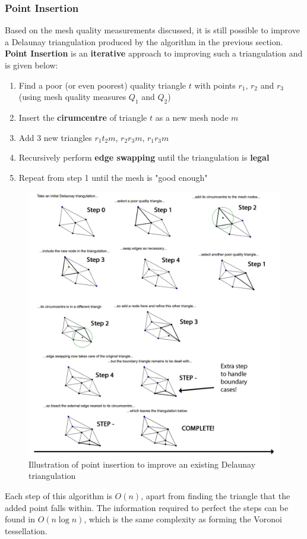 \documentclass{article}
\begin{document}
\subsubsection{Point Insertion}

Based on the mesh quality measurements discussed, it is still possible to improve a Delaunay triangulation produced by the algorithm in the previous section. \textbf{Point Insertion} is an \textbf{iterative} approach to improving such a triangulation and is given below:
\begin{enumerate}
	\item Find a poor (or even poorest) quality triangle $t$ with points $r_1$, $r_2$ and $r_3$ (using mesh quality measures $Q_1$ and $Q_2$)
	\item Insert the \textbf{cirumcentre} of triangle $t$ as a new mesh node $m$
	\item Add 3 new triangles $r_1t_2m$, $r_2r_3m$, $r_1r_3m$
	\item Recursively perform \textbf{edge swapping} until the triangulation is \textbf{legal}
	\item Repeat from step 1 until the mesh is "good enough"
\end{enumerate}

\begin{figure}[H]
	\centering
	\includegraphics[scale=0.35]{figures/point-insertion.png}
	\caption{Illustration of point insertion to improve an existing Delaunay triangulation}
	\label{fig:point-insertion-example}
\end{figure}
Each step of this algorithm is $O(n)$, apart from finding the triangle that the added point falls within. The information required to perfect the steps can be found in $O(n\log n)$, which is the same complexity as forming the Voronoi tessellation.
\end{document}
